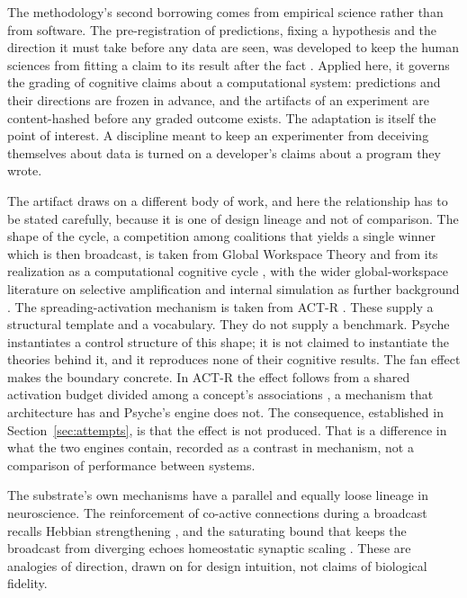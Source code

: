 \documentclass[11pt]{article}
\begin{document}
The methodology's second borrowing comes from empirical science rather than from software.
The pre-registration of predictions, fixing a hypothesis and the direction it must take
before any data are seen, was developed to keep the human sciences from fitting a claim to
its result after the fact \citep{nosek2018preregistration}. Applied here, it governs the
grading of cognitive claims about a computational system: predictions and their directions
are frozen in advance, and the artifacts of an experiment are content-hashed before any
graded outcome exists. The adaptation is itself the point of interest. A discipline meant
to keep an experimenter from deceiving themselves about data is turned on a developer's
claims about a program they wrote.

The artifact draws on a different body of work, and here the relationship has to be stated
carefully, because it is one of design lineage and not of comparison. The shape of the
cycle, a competition among coalitions that yields a single winner which is then broadcast,
is taken from Global Workspace Theory \citep{baars1988cognitive} and from its realization as
a computational cognitive cycle \citep{franklin2014lida}, with the wider global-workspace
literature on selective amplification and internal simulation as further background
\citep{dehaene2011experimental, shanahan2006combines, shanahan2010embodiment}. The
spreading-activation mechanism is taken from ACT-R \citep{anderson1998atomic}. These supply
a structural template and a vocabulary. They do not supply a benchmark. Psyche instantiates
a control structure of this shape; it is not claimed to instantiate the theories behind it,
and it reproduces none of their cognitive results. The fan effect makes the boundary
concrete. In ACT-R the effect follows from a shared activation budget divided among a
concept's associations \citep{anderson1974retrieval, andersonreder1999fan}, a mechanism that
architecture has and Psyche's engine does not. The consequence, established in
Section~\ref{sec:attempts}, is that the effect is not produced. That is a difference in what
the two engines contain, recorded as a contrast in mechanism, not a comparison of
performance between systems.

The substrate's own mechanisms have a parallel and equally loose lineage in neuroscience.
The reinforcement of co-active connections during a broadcast recalls Hebbian strengthening
\citep{hebb1949organization}, and the saturating bound that keeps the broadcast from
diverging echoes homeostatic synaptic scaling \citep{turrigiano2008selftuning}. These are
analogies of direction, drawn on for design intuition, not claims of biological fidelity.
\end{document}
